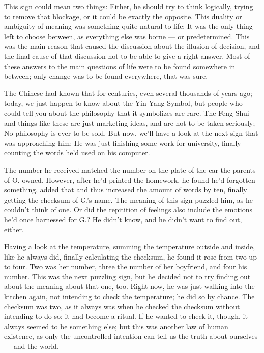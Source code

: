 This sign could mean two things: Either, he should try to think logically, trying to remove that blockage, or it could be exactly the opposite. 
This duality or ambiguity of meaning was something quite natural to life: It was the only thing left to choose between, as everything else was borne --- or predetermined.
This was the main reason that caused the discussion about the illusion of decision, and the final cause of that discussion not to be able to give a right answer. 
Most of these answers to the main questions of life were to be found somewhere in between; only change was to be found everywhere, that was sure.

The Chinese had known that for centuries, even several thousands of years ago; today, we just happen to know about the Yin-Yang-Symbol, but people who could tell you about the philosophy that it symbolizes are rare. 
The Feng-Shui and things like these are just marketing ideas, and are not to be taken seriously; No philosophy is ever to be sold. 
But now, we'll have a look at the next sign that was approaching him: He was just finishing some work for university, finally counting the words he'd used on his computer.

The number he received matched the number on the plate of the car the parents of O. owned. 
However, after he'd printed the homework, he found he'd forgotten something, added that and thus increased the amount of words by ten, finally getting the checksum of G.'s name. 
The meaning of this sign puzzled him, as he couldn't think of one. 
Or did the repitition of feelings also include the emotions he'd once harnessed for G.?
He didn't know, and he didn't want to find out, either.

Having a look at the temperature, summing the temperature outside and inside, like he always did, finally calculating the checksum, he found it rose from two up to four. 
Two was her number, three the number of her boyfriend, and four his number. 
This was the next puzzling sign, but he decided not to try finding out about the meaning about that one, too. 
Right now, he was just walking into the kitchen again, not intending to check the temperature; he did so by chance. The checksum was two, as it always was when he checked the checksum without intending to do so; it had become a ritual. If he wanted to check it, though, it always seemed to be something else; but this was another law of human existence, as only the uncontrolled intention can tell us the truth about ourselves --- and the world.

